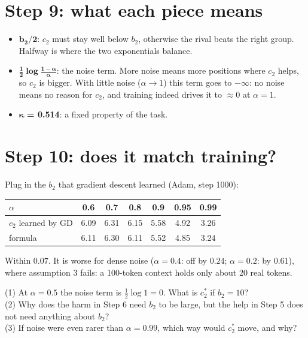 \documentclass[11pt]{article}
\newcommand{\1}{\mathbf{1}}
\begin{document}
\section{Step 9: what each piece means}
\begin{itemize}
\item $\mathbf{b_2/2}$: $c_2$ must stay well below $b_2$, otherwise the rival beats the right group. Halfway is
where the two exponentials balance.
\item $\mathbf{\tfrac12\log\frac{1-\alpha}{\alpha}}$: the noise term. More noise means more positions where $c_2$
helps, so $c_2$ is bigger. With little noise ($\alpha\to1$) this term goes to $-\infty$: no noise means no
reason for $c_2$, and training indeed drives it to $\approx0$ at $\alpha=1$.
\item $\boldsymbol\kappa$\textbf{ = 0.514}: a fixed property of the task.
\end{itemize}

\section{Step 10: does it match training?}
Plug in the $b_2$ that gradient descent learned (Adam, step 1000):
\begin{center}\begin{tabular}{lcccccc}\toprule
$\alpha$ & 0.6 & 0.7 & 0.8 & 0.9 & 0.95 & 0.99\\\midrule
$c_2$ learned by GD & 6.09 & 6.31 & 6.15 & 5.58 & 4.92 & 3.26\\
formula & 6.11 & 6.30 & 6.11 & 5.52 & 4.85 & 3.24\\\bottomrule
\end{tabular}\end{center}
Within $0.07$. It is worse for dense noise ($\alpha=0.4$: off by $0.24$; $\alpha=0.2$: by $0.61$), where
assumption 3 fails: a 100-token context holds only about 20 real tokens.

\begin{quickcheck}
(1) At $\alpha=0.5$ the noise term is $\tfrac12\log1=0$. What is $c_2^\ast$ if $b_2=10$?\\
(2) Why does the harm in Step 6 need $b_2$ to be large, but the help in Step 5 does not need anything
about $b_2$?\\
(3) If noise were even rarer than $\alpha=0.99$, which way would $c_2^\ast$ move, and why?
\end{quickcheck}
\end{document}
